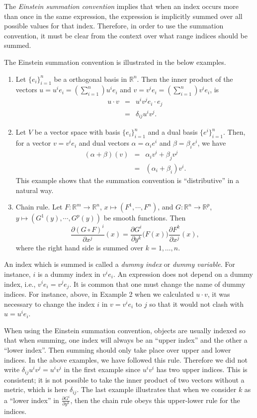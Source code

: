 \documentclass[12pt]{article}
\begin{document}
The \emph{Einstein summation convention} implies that when an index occurs
more than once in the same expression, the expression is implicitly
summed over all possible values for that index. Therefore, in order to
use the summation convention, it must be clear from the context
over what range indices should be summed.

The Einstein summation convention is illustrated in the below examples.
\begin{enumerate}
\item Let $\{e_i\}_{i=1}^n$ be a orthogonal basis in $\mathbb{R}^n$.
Then the inner product of the vectors $u=u^i e_i=(\sum_{i=1}^n) u^i e_i$
and $v=v^i e_i =(\sum_{i=1}^n) v^i e_i$, is
\begin{eqnarray*}
u\cdot v &=& u^i v^j e_i\cdot e_j \\
         &=& \delta_{ij} u^i v^j.
\end{eqnarray*}
\item Let $V$ be a  vector space with basis $\{e_i\}_{i=1}^n$ and
a dual basis $\{e^i\}_{i=1}^n$. Then, for a vector $v=v^i e_i$
and dual vectors $\alpha=\alpha_i e^i$ and $\beta=\beta_i e^i$, we have
\begin{eqnarray*}
 (\alpha+\beta)(v) &=& \alpha_iv^i + \beta_j v^j \\
        &=& (\alpha_i + \beta_i) v^i.
\end{eqnarray*}
This  example shows that the summation convention is ``distributive'' in
a natural way.
\item Chain rule. Let
$F:\mathbb{R}^m\to \mathbb{R}^n$,
$x \mapsto (F^1,\cdots, F^n)$, and
$G:\mathbb{R}^n\to \mathbb{R}^p$,
$y \mapsto (G^1(y),\cdots, G^p(y))$ be smooth functions. Then
$$ \frac{\partial (G\circ F)^i}{\partial x^j}(x) = \frac{\partial G^i}{\partial y^k} \big(F(x)\big) \frac{\partial F^k}{\partial x^j}(x),$$
where the right hand side is summed over $k=1,\ldots,n$.
\end{enumerate}

An index which is summed is called a \emph{dummy index} or \emph{dummy variable}.
For instance,
$i$ is a dummy index in $v^i e_i$. An expression does not depend on
a dummy index, i.e., $v^i e_i = v^j e_j$.
It is common that one must change the name of dummy indices. For
instance, above, in Example 2 when we calculated
$u\cdot  v$, it was necessary to change the index $i$ in $v=v^i e_i$ to $j$
so that it would not clash with $u=u^i e_i$.

When using the Einstein summation convention, objects are usually indexed
so that when summing, one index will always be an ``upper index'' and
the other a ``lower index''.
Then summing should only take place over upper and lower indices.
In the above examples, we have followed
this rule. Therefore we  did not write
$\delta_{ij} u^i v^j = u^i v^i$ in the first example since $u^i v^i$
has  two upper indices. This is consistent; it is not possible
to take the inner product of two vectors without a metric, which is here
$\delta_{ij}$.
The last example illustrates that when we consider $k$  as a ``lower
index'' in
$\frac{\partial G^i}{\partial y^k}$, then the chain rule
obeys this upper-lower rule for the indices.
\end{document}
